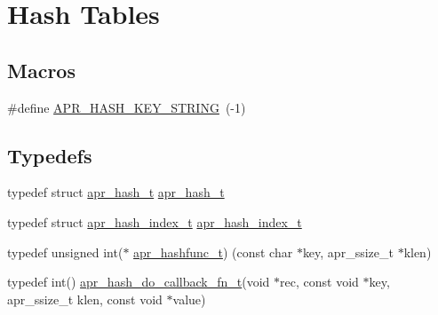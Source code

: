 \hypertarget{group__apr__hash}{}\section{Hash Tables}
\label{group__apr__hash}
\subsection*{Macros}
\begin{DoxyCompactItemize}
\item 
\#define \mbox{\hyperlink{group__apr__hash_ga3ba32541f2717b394000f87f38c7e12d}{A\+P\+R\+\_\+\+H\+A\+S\+H\+\_\+\+K\+E\+Y\+\_\+\+S\+T\+R\+I\+NG}}~(-\/1)
\end{DoxyCompactItemize}
\subsection*{Typedefs}
\begin{DoxyCompactItemize}
\item 
typedef struct \mbox{\hyperlink{group__apr__hash_ga72ec09b8bde6d874c36bd49df915fff6}{apr\+\_\+hash\+\_\+t}} \mbox{\hyperlink{group__apr__hash_ga72ec09b8bde6d874c36bd49df915fff6}{apr\+\_\+hash\+\_\+t}}
\item 
typedef struct \mbox{\hyperlink{group__apr__hash_ga3b3d353989f6cea4535630634be147f7}{apr\+\_\+hash\+\_\+index\+\_\+t}} \mbox{\hyperlink{group__apr__hash_ga3b3d353989f6cea4535630634be147f7}{apr\+\_\+hash\+\_\+index\+\_\+t}}
\item 
typedef unsigned int($\ast$ \mbox{\hyperlink{group__apr__hash_ga0bf5622266af13a2489c907a101cb156}{apr\+\_\+hashfunc\+\_\+t}}) (const char $\ast$key, apr\+\_\+ssize\+\_\+t $\ast$klen)
\item 
typedef int() \mbox{\hyperlink{group__apr__hash_gafaf9b4435ab207b7708533cb8544face}{apr\+\_\+hash\+\_\+do\+\_\+callback\+\_\+fn\+\_\+t}}(void $\ast$rec, const void $\ast$key, apr\+\_\+ssize\+\_\+t klen, const void $\ast$value)
\end{DoxyCompactItemize}
